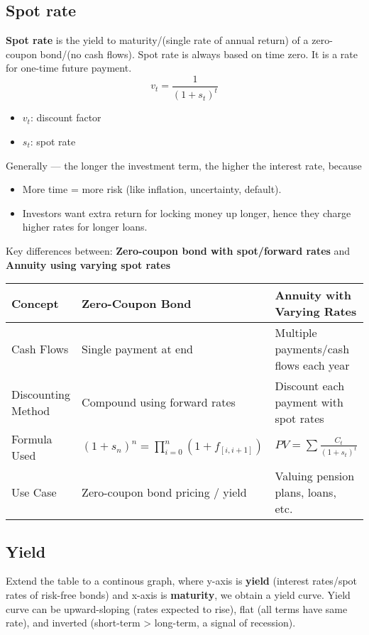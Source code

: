 \subsection{Spot rate}
\begin{definition}
    \textbf{Spot rate} is the yield to maturity/(single rate of annual return) of a zero-coupon bond/(no cash flows).  
Spot rate is always based on time zero. It is a rate for one-time future payment.
    \[ v_t = \frac{1}{(1+s_t)^t} \]

    \begin{itemize}
        \item $v_t$: discount factor
        \item $s_t$: spot rate
    \end{itemize}
\end{definition}

\begin{comments}
    Generally — the longer the investment term, the higher the interest rate, because 
    \begin{itemize}
        \item More time = more risk (like inflation, uncertainty, default). 
        \item Investors want extra return for locking money up longer, hence they charge higher rates for longer loans.
    \end{itemize}

    Key differences between: \textbf{Zero-coupon bond with spot/forward rates} and 
    \textbf{Annuity using varying spot rates} 

    \begin{tabular}{@{} l l l @{}}
\toprule
\textbf{Concept} & \textbf{Zero-Coupon Bond} & \textbf{Annuity with Varying Rates} \\
\midrule
Cash Flows & Single payment at end & Multiple payments/cash flows each year \\
Discounting Method & Compound using forward rates & Discount each payment with spot rates \\
Formula Used & 
\( (1 + s_n)^n = \prod_{i=0}^{n} (1 + f_{[i, i+1]}) \) & 
\( PV = \sum \frac{C_t}{(1 + s_t)^t} \) \\
Use Case & Zero-coupon bond pricing / yield & Valuing pension plans, loans, etc. \\
\bottomrule
\end{tabular}

\end{comments}

\subsection{Yield}
\begin{comments}
    Extend the table to a continous graph, where y-axis is \textbf{yield} (interest rates/spot rates
    of risk-free bonds) and x-axis is \textbf{maturity}, we obtain a yield curve. Yield curve can be 
    upward-sloping (rates expected to rise), flat (all terms have same rate), and inverted (short-term > long-term, 
    a signal of recession).  

\end{comments}

